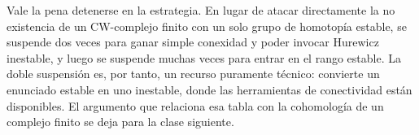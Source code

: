 \begin{nota}
   Vale la pena detenerse en la estrategia. En lugar de atacar directamente la no existencia de un CW-complejo finito con un solo grupo de homotopía estable, se suspende dos veces para ganar simple conexidad y poder invocar Hurewicz inestable, y luego se suspende muchas veces para entrar en el rango estable. La doble suspensión es, por tanto, un recurso puramente técnico: convierte un enunciado estable en uno inestable, donde las herramientas de conectividad están disponibles. El argumento que relaciona esa tabla con la cohomología de un complejo finito se deja para la clase siguiente.
\end{nota}
